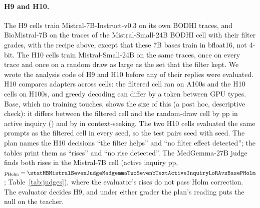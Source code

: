 \documentclass{article}
\newcommand{\bodhi}{BODHI}
\begin{document}
\paragraph{H9 and H10.} The H9 cells train Mistral-7B-Instruct-v0.3 on its own \bodhi{} traces, and
BioMistral-7B on the traces of the Mistral-Small-24B \bodhi{} cell with their filter grades, with the
recipe above, except that these 7B bases train in bfloat16, not 4-bit. The H10 cells train Mistral-Small-24B on the same traces, once on every trace and once
on a random draw as large as the set that the filter kept. We wrote the analysis code of H9 and H10
before any of their replies were evaluated. H10 compares adapters across cells: the filtered cell ran on
A100s and the H10 cells on H100s, and greedy decoding can differ by a token between GPU types. Base,
which no training touches, shows the size of this (a post hoc, descriptive check): it differs between the filtered cell and the
random-draw cell by \statHypHTenHBMistralBaseActiveInquiryDiff{} pp in active inquiry
(\statHypHTenHBMistralBaseActiveInquiryCI) and by \statHypHTenHBMistralBaseContextSeekingDiff{} in
context-seeking. The two H10 cells evaluated the same prompts as the filtered cell in every seed, so
the test pairs seed with seed. The plan names the H10 decisions ``the filter helps'' and ``no filter
effect detected''; the tables print them as ``rises'' and ``no rise detected''. The MedGemma-27B judge
finds both rises in the Mistral-7B cell (active inquiry
\statHBMistralSevenJudgeMedgemmaTwoSevenbTextActiveInquiryLoRAvsBaseDiff{} pp, $p_{\text{Holm}} =
\statHBMistralSevenJudgeMedgemmaTwoSevenbTextActiveInquiryLoRAvsBasePHolm$; Table~\ref{tab:judges}), where the
evaluator's rises do not pass Holm correction. The evaluator decides H9, and under either grader the
plan's reading puts the null on the teacher.

\begin{table}[!ht]
\centering
\caption{Every outcome of the planned tests of \S\ref{sec:rerun}, with the plan's decision on
each cell's first row. Notation as in Table~\ref{tab:hypotheses}. For H3, the second row of each
cell is LoRA $-$ Base on the asking rate of the complete versions, which the mimicry rule reads.
For H6, the second row is the plan's primary test, read only if the first row shows a drop. For
H10 and H10u, the difference is the filtered adapter minus the named one, with $p$ Holm-adjusted over
the two asking outcomes. For
H7, the second row is a secondary outcome, the same rate on the emergent prompts, with its paired
$t$. Questions marked k: the MedGemma-27B cells with replies of up to 1,024 tokens (the token cap,
below). For H2 on MedGemma-27B the unadjusted interval lies below 0 but $p_{\text{Holm}}$ is above
0.05; the plan's rule reads the Holm-adjusted $p$, so the table prints ``no change detected''.}
\label{tab:hypotheses-full}
\scriptsize
\setlength{\tabcolsep}{2pt}
\resizebox{\linewidth}{!}{}
\end{table}
\end{document}
